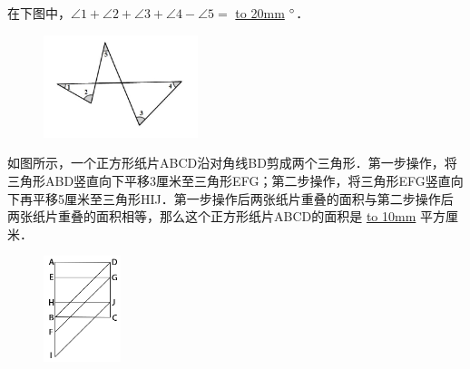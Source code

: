 \item {
    {在下图中，$\angle 1 + \angle 2 + \angle 3 + \angle 4 - \angle 5=$ \underline{\hbox to 20mm{}} $\degree$．} 
    \begin{figure}[H] 
        \centering
        \includegraphics[width=0.4\textwidth]{./pics/Chapter_3/9.png}
    \end{figure}
    \vspace{1cm}
}
\item {
    {如图所示，一个正方形纸片ABCD沿对角线BD剪成两个三角形．第一步操作，将三角形ABD竖直向下平移3厘米至三角形EFG；第二步操作，将三角形EFG竖直向下再平移5厘米至三角形HIJ．第一步操作后两张纸片重叠的面积与第二步操作后两张纸片重叠的面积相等，那么这个正方形纸片ABCD的面积是 \underline{\hbox to 10mm{}} 平方厘米．} 
    \begin{figure}[H] 
        \centering
        \includegraphics[width=0.2\textwidth]{./pics/Chapter_3/10.png}
    \end{figure}
    \vspace{1cm}
}

